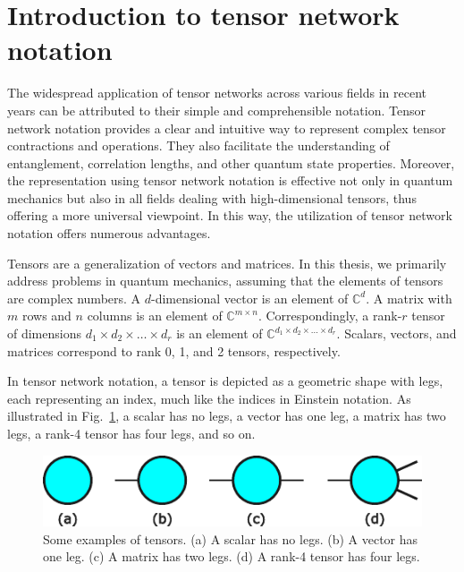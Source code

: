 \documentclass[12pt,dvipdfmx,twoside,openright]{report}
\begin{document}

\section{Introduction to tensor network notation}
The widespread application of tensor networks across various fields in recent years can be attributed to their simple and comprehensible notation.
Tensor network notation provides a clear and intuitive way to represent complex tensor contractions and operations.
They also facilitate the understanding of entanglement, correlation lengths, and other quantum state properties.
Moreover, the representation using tensor network notation is effective not only in quantum mechanics but also in all fields dealing with high-dimensional tensors, thus offering a more universal viewpoint.
In this way, the utilization of tensor network notation offers numerous advantages.

Tensors are a generalization of vectors and matrices.
In this thesis, we primarily address problems in quantum mechanics, assuming that the elements of tensors are complex numbers.
A $d$-dimensional vector is an element of $\mathbb C^d$.
A matrix with $m$ rows and $n$ columns is an element of $\mathbb C^{m \times n}$.
Correspondingly, a rank-$r$ tensor of dimensions $d_1\times d_2 \times \dots \times d_r$ is an element of $\mathbb C^{d_1\times d_2 \times \dots \times d_r}$.
Scalars, vectors, and matrices correspond to rank 0, 1, and 2 tensors, respectively.

In tensor network notation, a tensor is depicted as a geometric shape with legs, each representing an index, much like the indices in Einstein notation.
As illustrated in Fig.~\ref{fig:tensor-example}, a scalar has no legs, a vector has one leg, a matrix has two legs, a rank-4 tensor has four legs, and so on.

\begin{figure}
    \centering
    \includegraphics[width=0.5\linewidth]{tensor-example.pdf}
    \caption{Some examples of tensors. 
    (a) A scalar has no legs. 
    (b) A vector has one leg.
    (c) A matrix has two legs.
    (d) A rank-4 tensor has four legs.}
    \label{fig:tensor-example}
\end{figure}
\end{document}
